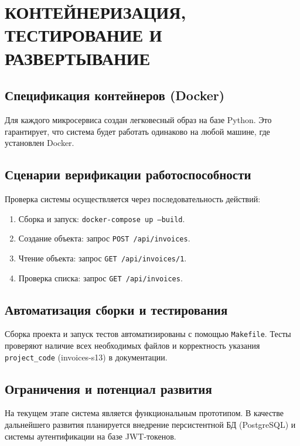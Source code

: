 \section{КОНТЕЙНЕРИЗАЦИЯ, ТЕСТИРОВАНИЕ И РАЗВЕРТЫВАНИЕ}

\subsection{Спецификация контейнеров (Docker)}
Для каждого микросервиса создан легковесный образ на базе Python. Это гарантирует, что система будет работать одинаково на любой машине, где установлен Docker.

\subsection{Сценарии верификации работоспособности}
Проверка системы осуществляется через последовательность действий:
\begin{enumerate}
    \item Сборка и запуск: \texttt{docker-compose up --build}.
    \item Создание объекта: запрос \texttt{POST /api/invoices}.
    \item Чтение объекта: запрос \texttt{GET /api/invoices/1}.
    \item Проверка списка: запрос \texttt{GET /api/invoices}.
\end{enumerate}

\subsection{Автоматизация сборки и тестирования}
Сборка проекта и запуск тестов автоматизированы с помощью \texttt{Makefile}. Тесты проверяют наличие всех необходимых файлов и корректность указания \texttt{project\_code} (invoices-s13) в документации.

\subsection{Ограничения и потенциал развития}
На текущем этапе система является функциональным прототипом. В качестве дальнейшего развития планируется внедрение персистентной БД (PostgreSQL) и системы аутентификации на базе JWT-токенов.
